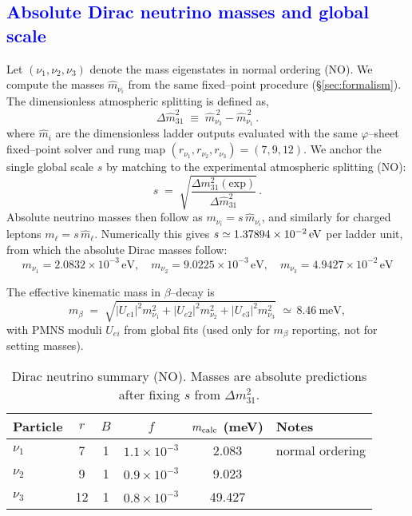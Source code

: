 \documentclass[%
 amsmath,amssymb,
 aps,
prb,
floatfix, showkeys
]{revtex4-2}
\newcommand{\modif}[1]{\textcolor{blue}{#1}}
\begin{document}
{\modif{
\subsection{Absolute Dirac neutrino masses and global scale}
\label{subsec:nu-absolute}
}}
Let $(\nu_1,\nu_2,\nu_3)$ denote the mass eigenstates in normal ordering (NO).
We compute the masses $\widehat m_{\nu_i}$ from the same fixed--point procedure (\S\ref{sec:formalism}).
The dimensionless atmospheric splitting is defined as, 
\begin{equation}
  \Delta \widehat m^2_{31} \;\equiv\; \widehat m_{\nu_3}^{\,2} - \widehat m_{\nu_1}^{\,2}\,.
  \label{eq:dimless_atmo}
\end{equation}
where $\widehat m_i$ are the dimensionless ladder outputs evaluated with the same
$\varphi$--sheet fixed--point solver and rung map $(r_{\nu_1},r_{\nu_2},r_{\nu_3})=(7,9,12)$.
We anchor the single global scale $s$ by matching to the experimental atmospheric splitting (NO):
\begin{equation}
  s \;=\; \sqrt{\frac{\Delta m^2_{31}(\mathrm{exp})}{\Delta \widehat m^2_{31}}}\,.
  \label{eq:nu_global_scale}
\end{equation}
Absolute neutrino masses then follow as $m_{\nu_i}=s\,\widehat m_{\nu_i}$, and
similarly for charged leptons $m_\ell=s\,\widehat m_\ell$.
 Numerically this gives
$s \simeq 1.37894\times10^{-2}\,{\rm eV}$ per ladder unit, from which the absolute Dirac masses follow:
\[
m_{\nu_1}=2.0832\times10^{-3}\,\text{eV},\quad
m_{\nu_2}=9.0225\times10^{-3}\,\text{eV},\quad
m_{\nu_3}=4.9427\times10^{-2}\,\text{eV}
\]

The effective kinematic mass in $\beta$--decay is
\begin{equation}
  m_\beta \;=\; \sqrt{|U_{e1}|^2 m_{\nu_1}^2 + |U_{e2}|^2 m_{\nu_2}^2 + |U_{e3}|^2 m_{\nu_3}^2}\,\,\simeq\,8.46~\text{meV},
  \label{eq:mbeta_def}
\end{equation}
with PMNS moduli $U_{ei}$ from global fits \cite{NuFIT52} (used only for $m_\beta$ reporting, not for setting masses).
\begin{table}[H]
\caption{Dirac neutrino summary (NO). Masses are absolute predictions after fixing $s$ from $\Delta m^2_{31}$.}
\label{tab:neutrinos}
\begin{tabular}{l c c c c l}
\hline
Particle & $r$ & $B$ & $f$ & $m_{\rm calc}$ (meV) & Notes \\
\hline
$\nu_1$ & 7  & 1 & $1.1\times10^{-3}$ & 2.083 & normal ordering \\
$\nu_2$ & 9  & 1 & $0.9\times10^{-3}$ & 9.023 &  \\
$\nu_3$ & 12 & 1 & $0.8\times10^{-3}$ & 49.427 &  \\
\hline
\end{tabular}
\end{table}
\end{document}
